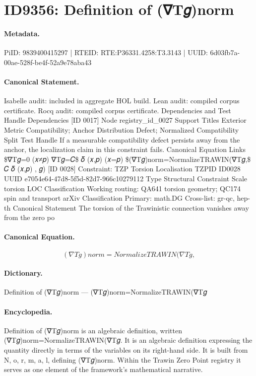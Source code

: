 \section*{ID9356: Definition of (∇T𝑔)norm}
\paragraph{Metadata.}
PiID: 9839400415297 | RTEID: RTE:P36331.4258:T3.3143 | UUID: 6d03fb7a-00ae-528f-be4f-52a9e78aba43

\paragraph{Canonical Statement.}
Isabelle audit: included in aggregate HOL build. Lean audit: compiled corpus certificate. Rocq audit: compiled corpus certificate. Dependencies and Test Handle Dependencies [ID 0017] Node registry\_id\_0027 Support Titles Exterior Metric Compatibility; Anchor Distribution Defect; Normalized Compatibility Split Test Handle If a measurable compatibility defect persists away from the anchor, the localization claim in this constraint fails. Canonical Equation Links \$∇T𝑔=0 (𝑥≠𝑝) ∇T𝑔=𝐶\$ 𝛿 (𝑥,𝑝) (𝑥=𝑝) \$(∇T𝑔)norm=NormalizeTRAWIN(∇T𝑔,\$ 𝐶 𝛿 (𝑥,𝑝) , 𝑔) [ID 0028] Constraint: TZP Torsion Localisation TZPID ID0028 UUID e7054e64-47d8-5f5d-82d7-966c10279112 Type Structural Constraint Scale torsion LOC Classification Working routing: QA641 torsion geometry; QC174 spin and transport arXiv Classification Primary: math.DG Cross-list: gr-qc, hep-th Canonical Statement The torsion of the Trawinistic connection vanishes away from the zero po

\paragraph{Canonical Equation.}
\[
(∇T𝑔)norm=NormalizeTRAWIN(∇T𝑔,
\]

\paragraph{Dictionary.}
Definition of (∇T𝑔)norm — (∇T𝑔)norm=NormalizeTRAWIN(∇T𝑔

\paragraph{Encyclopedia.}
Definition of (∇T𝑔)norm is an algebraic definition, written (∇T𝑔)norm=NormalizeTRAWIN(∇T𝑔. It is an algebraic definition expressing the quantity directly in terms of the variables on its right-hand side. It is built from N, o, r, m, a, l, defining (∇T𝑔)norm. Within the Trawin Zero Point registry it serves as one element of the framework's mathematical narrative.
